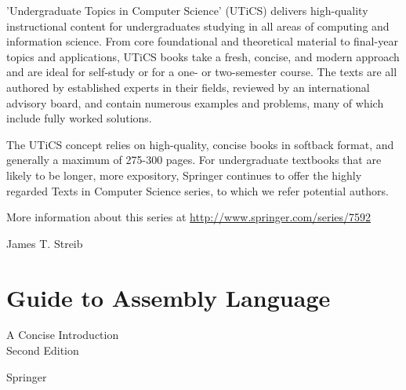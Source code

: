 \documentclass[10pt]{book}
\begin{document}
'Undergraduate Topics in Computer Science' (UTiCS) delivers high-quality instructional content for undergraduates studying in all areas of computing and information science. From core foundational and theoretical material to final-year topics and applications, UTiCS books take a fresh, concise, and modern approach and are ideal for self-study or for a one- or two-semester course. The texts are all authored by established experts in their fields, reviewed by an international advisory board, and contain numerous examples and problems, many of which include fully worked solutions.

The UTiCS concept relies on high-quality, concise books in softback format, and generally a maximum of 275-300 pages. For undergraduate textbooks that are likely to be longer, more expository, Springer continues to offer the highly regarded Texts in Computer Science series, to which we refer potential authors.

More information about this series at \href{http://www.springer.com/series/7592}{http://www.springer.com/series/7592}

James T. Streib

\section*{Guide to Assembly Language }
A Concise Introduction\\
Second Edition

Springer
\end{document}
